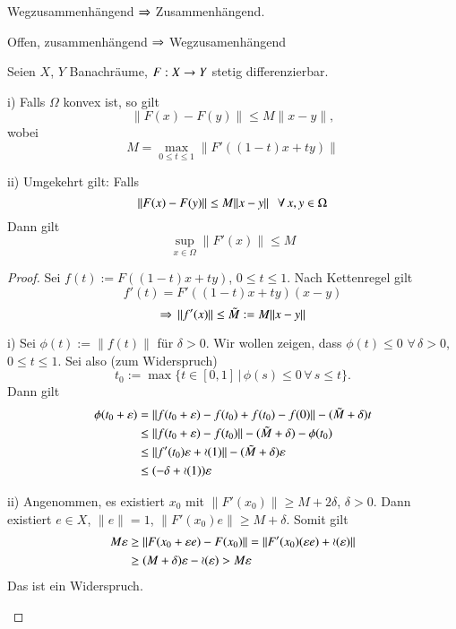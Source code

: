 \begin{remark}
    Wegzusammenhängend $\Rightarrow$ Zusammenhängend.

    \noindent Offen, zusammenhängend $\Rightarrow$ Wegzusamenhängend
\end{remark}

\begin{theorem}[Mittelwert]\label{1.15}
    Seien $X$, $Y$ Banachräume, $F:X\rightarrow Y$ stetig differenzierbar.
    \begin{description}
    \item{i)}
    Falls $\Omega$ konvex ist, so gilt
    \[
        \|F(x)-F(y)\|\leq M\|x-y\|,
    \]
    wobei
    \[
        M=\max_{0\leq t \leq 1}\| F'((1-t)x + ty) \|
    \]
    \item{ii)}
    Umgekehrt gilt: Falls
    \[
        \| F(x)-F(y) \|\leq M\|x-y\| \hspace{.25cm} \forall \, x,y\in \Omega
    \]
    Dann gilt
    \[
        \sup_{x\in \Omega}\|F'(x)\|\leq M
    \]
    \end{description}
\end{theorem}

\begin{proof}
    Sei $f(t):= F((1-t)x+ty)$, $0\leq t\leq1$. Nach Kettenregel gilt
    \[
        f'(t)=F'((1-t)x+ty)(x-y)  
    \]
    \[
        \Rightarrow \, \|f'(x)\|\leq\tilde M:= M\|x-y\|  
    \]
    \begin{description}
    \item{i)}
    Sei $\phi(t):=\|f(t)\|$ für $\delta>0$. Wir wollen zeigen, dass $\phi(t)\leq0$ $\forall \, 
    \delta>0$, $0\leq t\leq1$. Sei also (zum Widerspruch)
    \[
        t_0:=\max\{t\in [0,1]\, | \, \phi(s)\leq 0 \, \forall \, s\leq t\}.
    \]
    Dann gilt
    \begin{align*}
        \phi(t_0+\varepsilon)&=\|f(t_0+\varepsilon)-f(t_0)+f(t_0)-f(0)\|-(\tilde M + \delta)t\\
        &\leq \|f(t_0+\varepsilon)-f(t_0)\|-(\tilde M +\delta) -\phi(t_0)\\
        &\leq \|f'(t_0)\varepsilon+ \mathcal o (1)\|-(\tilde M +\delta)\varepsilon\\
        &\leq (-\delta + \mathcal o (1))\varepsilon 
    \end{align*}
    \item{ii)}
    Angenommen, es existiert $x_0$ mit $\|F'(x_0)\|\geq M+2\delta$, $\delta>0$. Dann existiert
    $e\in X$, $\|e\|=1$, $\| F'(x_0)e \|\geq M+\delta$. Somit gilt
    \begin{align*}
        M\varepsilon&\geq \|F(x_0+\varepsilon e) - F(x_0)\|= \|F'(x_0)(\varepsilon e)+\mathcal o (\varepsilon)\|\\
         &\geq (M+\delta)\varepsilon- \mathcal o(\varepsilon) > M\varepsilon
    \end{align*}
    Das ist ein Widerspruch.
    \end{description}
    \[\]
\end{proof}

